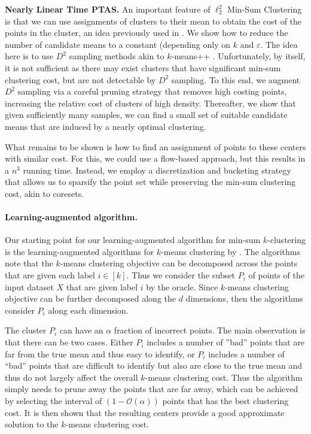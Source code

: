 \documentclass[11pt]{article}
\renewcommand{\O}[1]{\ensuremath{\mathcal{O}\left(#1\right)}}
\begin{document}
\textbf{Nearly Linear Time PTAS.} An important feature of $\ell_2^2$ Min-Sum Clustering is that we can use assignments of clusters to their mean to obtain the cost of the points in the cluster, an idea previously used in \cite{Indyk99,Matousek00,Schulman00,VegaKKR03}. We show how to reduce the number of candidate means to a constant (depending only on $k$ and $\varepsilon$.
The idea here is to use $D^2$ sampling methods akin to $k$-means++ \cite{ArthurV07}. Unfortunately, by itself, it is not sufficient as there may exist clusters that have significant min-sum clustering cost, but are not detectable by $D^2$ sampling. To this end, we augment $D^2$ sampling via a careful pruning strategy that removes high costing points, increasing the relative cost of clusters of high density. 
Thereafter, we show that given sufficiently many samples, we can find a small set of suitable candidate means that are induced by a nearly optimal clustering.

What remains to be shown is how to find an assignment of points to these centers with similar cost. For this, we could use a flow-based approach, but this results in a $n^3$ running time. Instead, we employ a discretization and bucketing strategy that allows us to sparsify the point set while preserving the min-sum clustering cost, akin to coresets.

\paragraph{Learning-augmented algorithm.}
Our starting point for our learning-augmented algorithm for min-sum $k$-clustering is the learning-augmented algorithms for $k$-means clustering by \cite{ErgunFSWZ22,NguyenCN23}. 
The algorithms note that the $k$-means clustering objective can be decomposed across the points that are given each label $i\in[k]$. 
Thus we consider the subset $P_i$ of points of the input dataset $X$ that are given label $i$ by the oracle. 
Since $k$-means clustering objective can be further decomposed along the $d$ dimensions, then the algorithms consider $P_i$ along each dimension. 

The cluster $P_i$ can have an $\alpha$ fraction of incorrect points. 
The main observation is that there can be two cases. 
Either $P_i$ includes a number of ''bad'' points that are far from the true mean and thus easy to identify, or $P_i$ includes a number of ``bad'' points that are difficult to identify but also are close to the true mean and thus do not largely affect the overall $k$-means clustering cost. 
Thus the algorithm simply needs to prune away the points that are far away, which can be achieved by selecting the interval of $(1-\O{\alpha})$ points that has the best clustering cost. 
It is then shown that the resulting centers provide a good approximate solution to the $k$-means clustering cost. 
\end{document}
